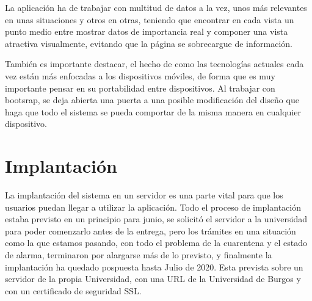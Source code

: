 La aplicación ha de trabajar con multitud de datos a la vez, unos más relevantes en unas situaciones y otros en otras, teniendo que encontrar en cada vista un punto medio entre mostrar datos de importancia real y componer una vista atractiva visualmente, evitando que la página se sobrecargue de información.

También es importante destacar, el hecho de como las tecnologías actuales cada vez están más enfocadas a los dispositivos móviles, de forma que es muy importante pensar en su portabilidad entre dispositivos. Al trabajar con bootsrap, se deja abierta una puerta a una posible modificación del diseño que haga que todo el sistema se pueda comportar de la misma manera en cualquier dispositivo.  

\section{Implantación}

La implantación del sistema en un servidor es una parte vital para que los usuarios puedan llegar a utilizar la aplicación. Todo el proceso de implantación estaba previsto en un principio para junio, se solicitó el servidor a la universidad para poder comenzarlo antes de la entrega, pero los trámites en una situación como la que estamos pasando, con todo el problema de la cuarentena y el estado de alarma, terminaron por alargarse más de lo previsto, y finalmente la implantación ha quedado pospuesta hasta Julio de 2020. 
Esta prevista sobre un servidor de la propia Universidad, con una URL de la Universidad de Burgos y con un certificado de seguridad SSL.